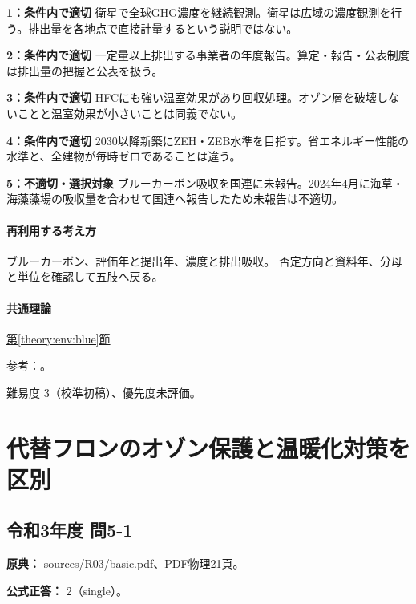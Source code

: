 \noindent\textbf{1：条件内で適切} 衛星で全球GHG濃度を継続観測。衛星は広域の濃度観測を行う。排出量を各地点で直接計量するという説明ではない。\par

\noindent\textbf{2：条件内で適切} 一定量以上排出する事業者の年度報告。算定・報告・公表制度は排出量の把握と公表を扱う。\par

\noindent\textbf{3：条件内で適切} HFCにも強い温室効果があり回収処理。オゾン層を破壊しないことと温室効果が小さいことは同義でない。\par

\noindent\textbf{4：条件内で適切} 2030以降新築にZEH・ZEB水準を目指す。省エネルギー性能の水準と、全建物が毎時ゼロであることは違う。\par

\noindent\textbf{5：不適切・選択対象} ブルーカーボン吸収を国連に未報告。2024年4月に海草・海藻藻場の吸収量を合わせて国連へ報告したため未報告は不適切。\par

\paragraph{再利用する考え方} ブルーカーボン、評価年と提出年、濃度と排出吸収。 否定方向と資料年、分母と単位を確認して五肢へ戻る。

\paragraph{共通理論} \hyperref[theory:env:blue]{第\ref*{theory:env:blue}節}

\par 参考：\cite{env60_blue}。

\par 難易度 3（校準初稿）、優先度未評価。

\section{代替フロンのオゾン保護と温暖化対策を区別}

\subsection{令和3年度 問5-1}
\label{q:r03-reg-basic-5-1}

\noindent\textbf{原典：} sources/R03/basic.pdf、PDF物理21頁。

\textbf{公式正答：} 2（single）。


